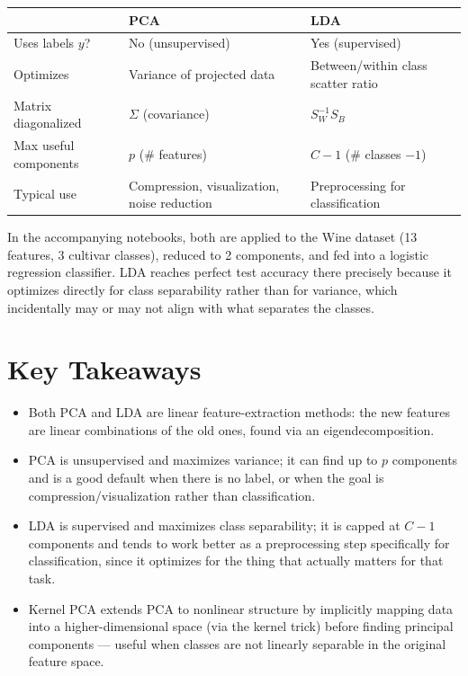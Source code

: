 \documentclass[11pt]{article}
\begin{document}
\begin{center}
\begin{tabular}{lll}
  \toprule
  & PCA & LDA \\
  \midrule
  Uses labels $y$? & No (unsupervised) & Yes (supervised) \\
  Optimizes & Variance of projected data & Between/within class scatter ratio \\
  Matrix diagonalized & $\Sigma$ (covariance) & $S_W^{-1} S_B$ \\
  Max useful components & $p$ (\# features) & $C - 1$ (\# classes $- 1$) \\
  Typical use & Compression, visualization, noise reduction & Preprocessing for classification \\
  \bottomrule
\end{tabular}
\end{center}

In the accompanying notebooks, both are applied to the Wine dataset (13
features, 3 cultivar classes), reduced to 2 components, and fed into a
logistic regression classifier. LDA reaches perfect test accuracy there
precisely because it optimizes directly for class separability rather than
for variance, which incidentally may or may not align with what separates
the classes.

\section{Key Takeaways}

\begin{itemize}
  \item Both PCA and LDA are linear feature-extraction methods: the new
        features are linear combinations of the old ones, found via an
        eigendecomposition.
  \item PCA is unsupervised and maximizes variance; it can find up to $p$
        components and is a good default when there is no label, or when
        the goal is compression/visualization rather than classification.
  \item LDA is supervised and maximizes class separability; it is capped
        at $C-1$ components and tends to work better as a preprocessing
        step specifically for classification, since it optimizes for the
        thing that actually matters for that task.
  \item Kernel PCA extends PCA to nonlinear structure by implicitly
        mapping data into a higher-dimensional space (via the kernel
        trick) before finding principal components --- useful when classes
        are not linearly separable in the original feature space.
\end{itemize}
\end{document}

